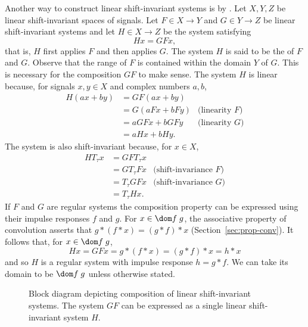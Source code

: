 Another way to construct linear shift-invariant systems is by .  Let $X, Y, Z$ be linear shift-invariant spaces of signals.  Let $F \in X \to Y$ and $G \in Y \to Z$ be linear shift-invariant systems and let $H \in X \to Z$ be the system satisfying
\[
H x = G F x,
\]
that is, $H$ first applies $F$ and then applies $G$.  The system $H$ is said to be the  of $F$ and $G$.  Observe that the range of $F$ is contained within the domain $Y$ of $G$.  This is necessary for the composition $GF$ to make sense.  The system $H$ is linear because, for signals $x,y \in X$ and complex numbers $a,b$,
\begin{align*}
H(ax + by) &= G F(ax + by) \\
&= G(aF x + bF y )  &\text{(linearity $F$)}\\
&= aG F x + bG F y  &\text{(linearity $G$)} \\
&= aHx + bHy.
\end{align*}
The system is also shift-invariant because, for $x \in X$,
\begin{align*}
H T_\tau x &= GF T_\tau x \\
&= G T_\tau F x  &\text{(shift-invariance $F$)}\\
&= T_\tau G F x  &\text{(shift-invariance $G$)} \\
&= T_\tau H x .
\end{align*}
If $F$ and $G$ are regular systems the composition property can be expressed using their impulse responses $f$ and $g$.  For $x \in \dom f\;g$, the associative property of convolution asserts that $g * (f * x) = (g* f) * x$ (Section~\ref{sec:prop-conv}).  It follows that, for $x \in \dom f\;g$,
\[
Hx = GF x = g * (f * x) = (g* f) * x = h * x
\]
and so $H$ is a regular system with impulse response $h = g * f$.  We can take its domain to be $\dom f\;g$ unless otherwise stated.  %

\begin{figure}
\centering
{}
\caption{Block diagram depicting composition of linear shift-invariant systems. The system $GF$ can be expressed as a single linear shift-invariant system $H$.}\label{blockdiag:compositionlti}
\end{figure}

